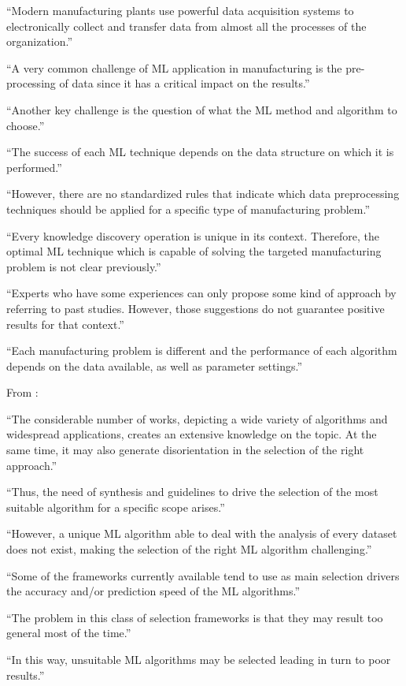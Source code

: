 “Modern manufacturing plants use powerful data acquisition systems to electronically collect and transfer data from almost all the processes of the organization.”

“A very common challenge of ML application in manufacturing is the pre-processing of data since it has a critical impact on the results.”

“Another key challenge is the question of what the ML method and algorithm to choose.”

“The success of each ML technique depends on the data structure on which it is performed.”

“However, there are no standardized rules that indicate which data preprocessing techniques should be applied for a specific type of manufacturing problem.”

“Every knowledge discovery operation is unique in its context. Therefore, the optimal ML technique which is capable of solving the targeted manufacturing problem is not clear previously.”

“Experts who have some experiences can only propose some kind of approach by referring to past studies. However, those suggestions do not guarantee positive results for that context.”

“Each manufacturing problem is different and the performance of each algorithm depends on the data available, as well as parameter settings.”

From \parencite{sala2018selecting_ml_algorithm} :

“The considerable number of works, depicting a wide variety of algorithms and widespread applications, creates an extensive knowledge on the topic. At the same time, it may also generate disorientation in the selection of the right approach.”

“Thus, the need of synthesis and guidelines to drive the selection of the most suitable algorithm for a specific scope arises.”

“However, a unique ML algorithm able to deal with the analysis of every dataset does not exist, making the selection of the right ML algorithm challenging.”

“Some of the frameworks currently available tend to use as main selection drivers the accuracy and/or prediction speed of the ML algorithms.”

“The problem in this class of selection frameworks is that they may result too general most of the time.”

“In this way, unsuitable ML algorithms may be selected leading in turn to poor results.”

